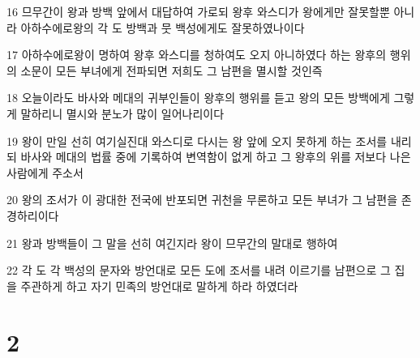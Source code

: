 \par 16 므무간이 왕과 방백 앞에서 대답하여 가로되 왕후 와스디가 왕에게만 잘못할뿐 아니라 아하수에로왕의 각 도 방백과 뭇 백성에게도 잘못하였나이다
\par 17 아하수에로왕이 명하여 왕후 와스디를 청하여도 오지 아니하였다 하는 왕후의 행위의 소문이 모든 부녀에게 전파되면 저희도 그 남편을 멸시할 것인즉
\par 18 오늘이라도 바사와 메대의 귀부인들이 왕후의 행위를 듣고 왕의 모든 방백에게 그렇게 말하리니 멸시와 분노가 많이 일어나리이다
\par 19 왕이 만일 선히 여기실진대 와스디로 다시는 왕 앞에 오지 못하게 하는 조서를 내리되 바사와 메대의 법률 중에 기록하여 변역함이 없게 하고 그 왕후의 위를 저보다 나은 사람에게 주소서
\par 20 왕의 조서가 이 광대한 전국에 반포되면 귀천을 무론하고 모든 부녀가 그 남편을 존경하리이다
\par 21 왕과 방백들이 그 말을 선히 여긴지라 왕이 므무간의 말대로 행하여
\par 22 각 도 각 백성의 문자와 방언대로 모든 도에 조서를 내려 이르기를 남편으로 그 집을 주관하게 하고 자기 민족의 방언대로 말하게 하라 하였더라

\chapter{2}

